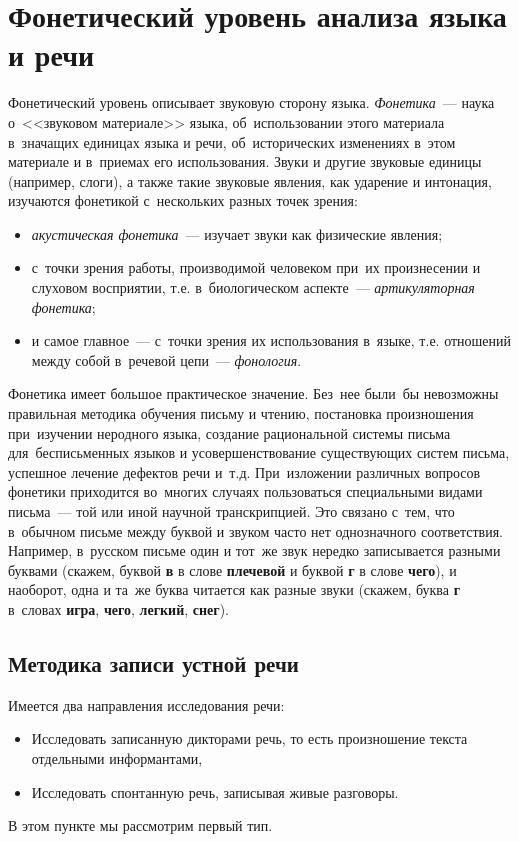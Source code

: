 \documentclass[12pt]{article}
\theoremstyle{definition}
\theoremstyle{remark}
\numberwithin{equation}{section}
\begin{document}
\section{Фонетический уровень анализа языка и речи}

Фонетический уровень описывает звуковую сторону языка. {\sl Фонетика}~---
наука о~<<звуковом материале>> языка, об~использовании этого
материала в~значащих единицах языка и речи, об~исторических изменениях
в~этом материале и в~приемах его использования. Звуки и другие звуковые
единицы (например, слоги), а также такие звуковые явления, как ударение
и интонация, изучаются фонетикой с~нескольких разных точек зрения:
\begin{itemize}
    \item {\sl акустическая фонетика}~--- изучает звуки как физические
    явления;
    \item с~точки зрения работы, производимой человеком при~их произнесении
    и слуховом восприятии, т.е. в~биологическом аспекте~--- {\sl артикуляторная
    фонетика};
    \item и самое главное~--- с~точки зрения их использования в~языке, т.е.
    отношений между собой в~речевой цепи~--- {\sl фонология}.
\end{itemize}

Фонетика имеет большое практическое значение. Без~нее были~бы
невозможны правильная методика обучения письму и чтению, постановка
произношения при~изучении неродного языка, создание рациональной
системы письма для~бесписьменных языков и усовершенствование
существующих систем письма, успешное лечение дефектов речи и~т.д.
При~изложении различных вопросов фонетики приходится во~многих
случаях пользоваться специальными видами письма~--- той или иной
научной транскрипцией. Это связано с~тем, что в~обычном письме
между буквой и звуком часто нет однозначного соответствия.
Например, в~русском письме один и тот~же звук нередко записывается
разными буквами (скажем, буквой {\bf в} в слове {\bf плечевой} и буквой {\bf г}
в слове {\bf чего}), и наоборот, одна и та~же буква читается как разные
звуки (скажем, буква {\bf г} в~словах {\bf игра}, {\bf чего},
{\bf легкий}, {\bf снег}).

\subsection{Методика записи устной речи}
Имеется два направления исследования речи:
\begin{itemize}
    \item Исследовать записанную дикторами речь, то есть произношение
    текста отдельными информантами,
    \item Исследовать спонтанную речь, записывая живые разговоры.
\end{itemize}
В этом пункте мы рассмотрим первый тип.
\end{document}
